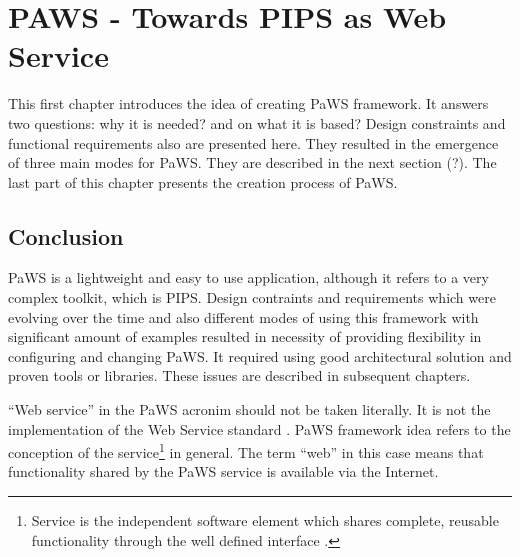 \chapter{PAWS - Towards PIPS as Web Service}

This first chapter introduces the idea of creating PaWS framework. It
answers two questions: why it is needed? and on what it is based? Design
constraints and functional requirements also are presented here. They
resulted in the emergence of three main modes for PaWS. They are
described in the next section (?). The last part of this chapter presents
the creation process of PaWS.







\section{Conclusion}

PaWS is a lightweight and easy to use application, although it refers to a very complex toolkit, which is PIPS. Design contraints and requirements which were evolving over the time and also different modes of using this framework with significant amount of examples resulted in necessity of providing flexibility in configuring and changing PaWS. It required using good architectural solution and proven tools or libraries. These issues are described in subsequent chapters.

``Web service'' in the PaWS acronim should not be taken literally. It is not the implementation of the Web Service standard \cite{ws_standard}. PaWS framework idea refers to the conception of the service\footnote{Service is the independent software element which shares complete, reusable  functionality through the well defined interface \cite{service_def}.} in general. The term ``web'' in this case means that functionality shared by the PaWS service is available via the Internet.

